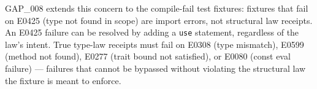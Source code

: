 GAP\_008 extends this concern to the compile-fail test fixtures: fixtures that fail on
E0425 (type not found in scope) are import errors, not structural law receipts. An
E0425 failure can be resolved by adding a \texttt{use} statement, regardless of the
law's intent. True type-law receipts must fail on E0308 (type mismatch), E0599 (method
not found), E0277 (trait bound not satisfied), or E0080 (const eval failure) —
failures that cannot be bypassed without violating the structural law the fixture is
meant to enforce.
